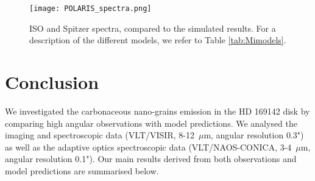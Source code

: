 \documentclass{aa}
\newcommand{\mic}{~$\mu$m\xspace}
\begin{document}
\begin{figure}[!ht]
    \centering
    \texttt{[image: POLARIS\_spectra.png]}
    \caption{ISO and Spitzer spectra, compared to the simulated results. For a description of the different models, we refer to Table \ref{tab:Mimodels}.}
    \label{fig:POLspectr}
\end{figure}

\section{Conclusion} \label{sec:conclusion}
We investigated the carbonaceous nano-grains emission in the HD 169142 disk by comparing high angular observations with model predictions. We analysed the imaging and spectroscopic
 data (VLT/VISIR, 8-12\mic, angular resolution 0.3") as well as the adaptive optics spectroscopic data (VLT/NAOS-CONICA, 
3-4\mic, angular resolution 0.1"). Our main results derived from both observations and model predictions are summarised below.
 
\end{document}
